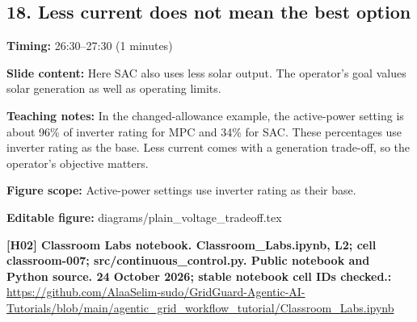 \documentclass[10pt,letterpaper]{article}
\begin{document}
\subsection*{18. Less current does not mean the best option}
\textbf{Timing:} 26:30--27:30 (1 minutes)\par
\textbf{Slide content:} Here SAC also uses less solar output.
The operator's goal values solar generation as well as operating limits.\par
\textbf{Teaching notes:} In the changed-allowance example, the active-power setting is about 96\% of inverter rating for MPC and 34\% for SAC. These percentages use inverter rating as the base. Less current comes with a generation trade-off, so the operator's objective matters.\par
\textbf{Figure scope:} Active-power settings use inverter rating as their base.\par
\textbf{Editable figure:} diagrams/plain\_voltage\_tradeoff.tex\par
\textbf{[H02] Classroom Labs notebook. Classroom\_Labs.ipynb, L2; cell classroom-007; src/continuous\_control.py. Public notebook and Python source. 24 October 2026; stable notebook cell IDs checked.:} \href{https://github.com/AlaaSelim-sudo/GridGuard-Agentic-AI-Tutorials/blob/main/agentic_grid_workflow_tutorial/Classroom_Labs.ipynb}{\small\ttfamily https:/\allowbreak{}/\allowbreak{}github.\allowbreak{}com/\allowbreak{}AlaaSelim-\allowbreak{}sudo/\allowbreak{}GridGuard-\allowbreak{}Agentic-\allowbreak{}AI-\allowbreak{}Tutorials/\allowbreak{}blob/\allowbreak{}main/\allowbreak{}agentic\_\allowbreak{}grid\_\allowbreak{}workflow\_\allowbreak{}tutorial/\allowbreak{}Classroom\_\allowbreak{}Labs.\allowbreak{}ipynb}\par
\par\medskip
\end{document}
